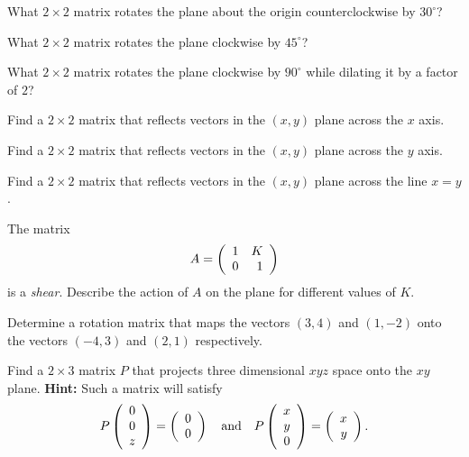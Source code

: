 \documentclass{ximera}
\begin{document}
\begin{exercise} \label{c4.2.1a}
What $2\times 2$ matrix rotates the plane about the origin counterclockwise
by $30^\circ$?
\end{exercise}
\begin{exercise} \label{c4.2.1b}
What $2\times 2$ matrix rotates the plane clockwise by $45^\circ$?
\end{exercise}
\begin{exercise} \label{c4.2.1c}
What $2\times 2$ matrix rotates the plane clockwise by $90^\circ$ while
dilating it by a factor of $2$?
\end{exercise}

\begin{exercise} \label{c4.2.2a}
Find a $2\times 2$ matrix that reflects vectors in the $(x,y)$ plane across
the $x$ axis.
\end{exercise}
\begin{exercise} \label{c4.2.2b}
Find a $2\times 2$ matrix that reflects vectors in the $(x,y)$ plane across
the $y$ axis.
\end{exercise}
\begin{exercise} \label{c4.2.2c}
Find a $2\times 2$ matrix that reflects vectors in the $(x,y)$ plane across
the line $x=y$.
\end{exercise}

\begin{exercise} \label{c7.8.1}
The matrix
\[
A=\left(\begin{array}{rr} 1 & K\\ 0 &1\end{array}\right)
\]
is a {\em shear}.  Describe the action of $A$ on the plane
for different values of $K$.
\end{exercise}

\begin{exercise} \label{c7.8.2}
Determine a rotation matrix that maps the vectors $(3,4)$ and
$(1,-2)$ onto the vectors $(-4,3)$ and $(2,1)$ respectively.
\end{exercise}



\begin{exercise} \label{c4.2.3}
Find a $2\times 3$ matrix $P$ that projects three dimensional $xyz$ space onto
the $xy$ plane.  {\bf Hint:} Such a matrix will satisfy
\[
P\left(\begin{array}{c} 0 \\ 0 \\ z \end{array}\right) = \left(\begin{array}{r} 0 \\ 0\end{array}\right)
\quad\mbox{and}\quad
P\left(\begin{array}{c} x \\ y \\ 0 \end{array}\right) = \left(\begin{array}{r} x \\ y\end{array}\right).
\]
\end{exercise}
\end{document}
